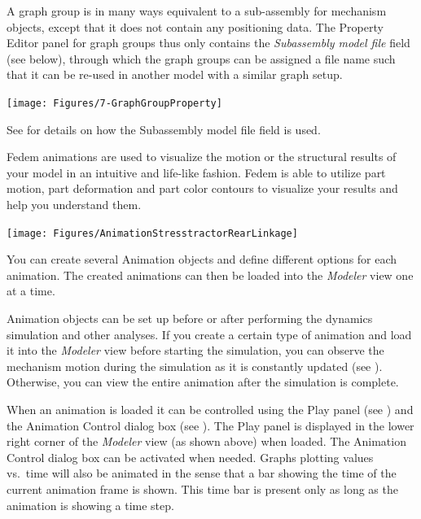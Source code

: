 A graph group is in many ways equivalent to a sub-assembly for
mechanism objects, except that it does not contain any positioning data.
The Property Editor panel for graph groups thus only contains the
{\sl Subassembly model file} field (see below), through which the graph
groups can be assigned a file name such that it can be re-used in
another model with a similar graph setup.

\noindent
\texttt{[image: Figures/7-GraphGroupProperty]}

See 
for details on how the Subassembly model file field is used.

\clearpage



Fedem animations are used to visualize the motion or the structural results of
your model in an intuitive and life-like fashion.
Fedem is able to utilize part motion, part deformation and
part color contours to visualize your results and help you understand them.

\begin{center}
  \texttt{[image: Figures/AnimationStresstractorRearLinkage]}
\end{center}

You can create several Animation objects and define different options for each
animation. The created animations can then be loaded into the {\sl Modeler}
view one at a time.

Animation objects can be set up before or after performing the dynamics
simulation and other analyses. If you create a certain type of animation and
load it into the {\sl Modeler} view before starting the simulation, you can
observe the mechanism motion during the simulation as it is constantly updated
(see ).
Otherwise, you can view the entire animation after the simulation is complete.

When an animation is loaded it can be controlled using the Play panel
(see ) and the Animation Control dialog box
(see ).
The Play panel is displayed in the lower right corner of the {\sl Modeler} view
(as shown above) when loaded.
The Animation Control dialog box can be activated when needed.
Graphs plotting values vs.\ time will also be animated in the sense that
a bar showing the time of the current animation frame is shown.
This time bar is present only as long as the animation is showing a time step.

